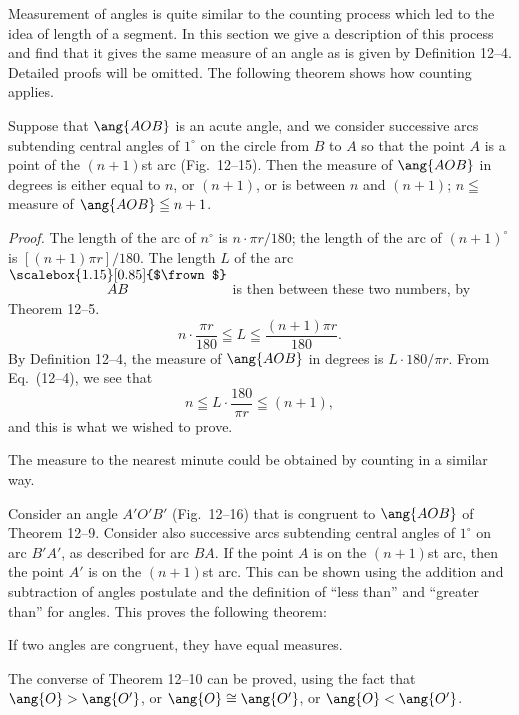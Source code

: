 \documentclass[11pt]{book}
\theoremstyle{bkplain}
\theoremstyle{XIplainnote}
\theoremstyle{bkplain}
\newcommand{\XIIarc}[1]{\overset{\raisebox{-0.25ex}{\scalebox{1.15}[0.85]{$\frown$}}}{#1}}
\theoremstyle{bkplain}
\begin{document}
Measurement of angles is quite similar to the counting process which led to the
idea of length of a segment. In this section we give a description of this
process and find that it gives the same measure of an angle as is given by
Definition 12--4. Detailed proofs will be omitted. The following theorem shows
how counting applies.

\begin{theorem}
Suppose that $\ang{AOB}$ is an acute angle, and we consider successive arcs
subtending central angles of $1^\circ$ on the circle from $B$ to $A$ so that the
point $A$ is a point of the $(n + 1)$st arc (Fig.~12--15). Then the measure of
$\ang{AOB}$ in degrees is either equal to $n$, or $(n + 1)$, or is between $n$
and $(n + 1)$; $n \leqq$ measure of $\ang{AOB} \leqq n + 1$.
\end{theorem}

\FIGXIIFIFTEEN

\noindent\emph{Proof.} The length of the arc of $n^\circ$ is
$n \cdot \pi r/180$; the length of the arc of $(n + 1)^\circ$ is
$[(n + 1)\pi r]/180$. The length $L$ of the arc $\XIIarc{AB}$ is then between
these two numbers, by Theorem 12--5.
\begin{equation}
n \cdot \frac{\pi r}{180} \leqq L \leqq \frac{(n + 1)\pi r}{180}.
\end{equation}
By Definition 12--4, the measure of $\ang{AOB}$ in degrees is
$L \cdot 180/\pi r$. From Eq.~(12--4), we see that
\[
n \leqq L \cdot \frac{180}{\pi r} \leqq (n + 1),
\]
and this is what we wished to prove.

\begin{remark}
The measure to the nearest minute could be obtained by counting in a similar
way.
\end{remark}

Consider an angle $A'O'B'$ (Fig.~12--16) that is congruent to $\ang{AOB}$ of
Theorem 12--9. Consider also successive arcs subtending central angles of
$1^\circ$ on arc $B'A'$, as described for arc $BA$. If the point $A$ is on the
$(n + 1)$st arc, then the point $A'$ is on the $(n + 1)$st arc. This can be
shown using the addition and subtraction of angles postulate and the definition
of ``less than'' and ``greater than'' for angles. This proves the following
theorem:

\begin{theorem}
If two angles are congruent, they have equal measures.
\end{theorem}

The converse of Theorem 12--10 can be proved, using the fact that
$\ang{O} > \ang{O'}$, or $\ang{O} \cong \ang{O'}$, or $\ang{O} < \ang{O'}$.
\end{document}
